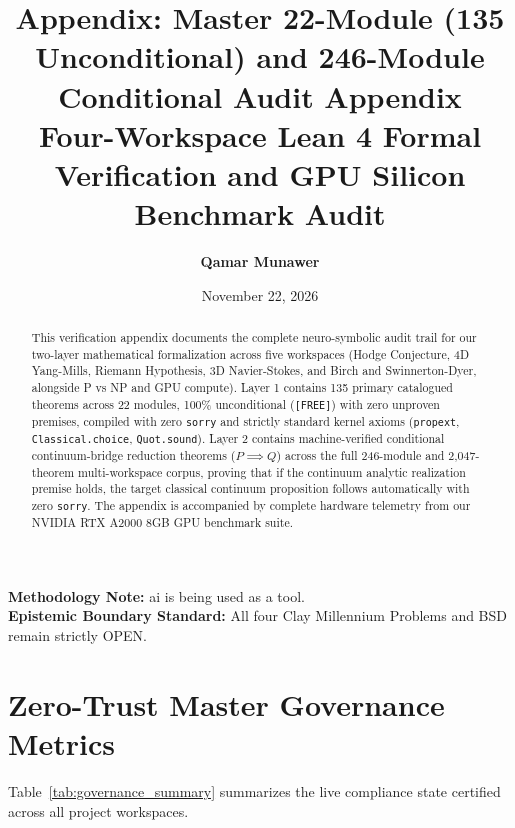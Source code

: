 \documentclass[11pt,a4paper]{article}
\title{\textbf{Appendix: Master 22-Module (135 Unconditional) and 246-Module Conditional Audit Appendix}\\\large Four-Workspace Lean 4 Formal Verification and GPU Silicon Benchmark Audit}
\author{\textbf{Qamar Munawer}}
\date{November 22, 2026}
\begin{document}
\maketitle

\begin{abstract}
This verification appendix documents the complete neuro-symbolic audit trail for our two-layer mathematical formalization across five workspaces (Hodge Conjecture, 4D Yang-Mills, Riemann Hypothesis, 3D Navier-Stokes, and Birch and Swinnerton-Dyer, alongside P vs NP and GPU compute). Layer 1 contains 135 primary catalogued theorems across 22 modules, 100\% unconditional (\texttt{[FREE]}) with zero unproven premises, compiled with zero \texttt{sorry} and strictly standard kernel axioms (\texttt{propext}, \texttt{Classical.choice}, \texttt{Quot.sound}). Layer 2 contains machine-verified conditional continuum-bridge reduction theorems ($P \implies Q$) across the full 246-module and 2,047-theorem multi-workspace corpus, proving that if the continuum analytic realization premise holds, the target classical continuum proposition follows automatically with zero \texttt{sorry}. The appendix is accompanied by complete hardware telemetry from our NVIDIA RTX A2000 8GB GPU benchmark suite.
\end{abstract}

\noindent\textbf{Methodology Note:} ai is being used as a tool.\\
\textbf{Epistemic Boundary Standard:} All four Clay Millennium Problems and BSD remain strictly OPEN.

\section{Zero-Trust Master Governance Metrics}

Table~\ref{tab:governance_summary} summarizes the live compliance state certified across all project workspaces.
\end{document}
